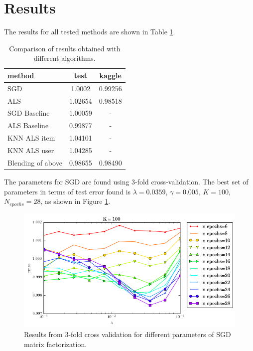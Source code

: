 \section{Results}

The results for all tested methods are shown in Table \ref{tab:results}.

\begin{table}
  \centering
\begin{tabular}{|l|c|c|}
  \hline
  method & test & kaggle\\
  \hline
  SGD & 1.0002 & 0.99256 \\
  ALS & 1.02654 & 0.98518 \\
  SGD Baseline & 1.00059 & -\\
  ALS Baseline & 0.99877 & -\\
  KNN ALS item & 1.04101 & -\\
  KNN ALS user & 1.04285 & -\\
  Blending of above & 0.98655 & 0.98490\\
  \hline
\end{tabular}
  \caption{Comparison of results obtained with different algorithms.}
  \label{tab:results}
\end{table}

The parameters for SGD are found using 3-fold cross-validation.
The best set of parameters in terms of test error found
is $\lambda=0.0359$, $\gamma=0.005$, $K=100$,
$N_{epochs} = 28$, as shown in Figure \ref{fig:sgd}.

\begin{figure}[htbp]
  \centering
  \includegraphics[width=.9\columnwidth]{figures/lambda_rmse_28_0_005.png}
  \vspace{-3mm}
  \caption{Results from 3-fold cross validation for different parameters of SGD
  matrix factorization.}
  \label{fig:sgd}
\end{figure}

